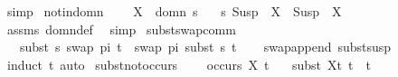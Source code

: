 \begin{isabellebody}
\ simp%
\endisatagproof
{\isafoldproof}%
%
\isadelimproof
\isanewline
%
\endisadelimproof
\isanewline
{}\isamarkupfalse%
\ not{\isacharunderscore}{\kern0pt}in{\isacharunderscore}{\kern0pt}domn{\isacharcolon}{\kern0pt}\ \isanewline
\ \ \ {\isachardoublequoteopen}X\ {\isasymnotin}\ {\isacharparenleft}{\kern0pt}domn\ s{\isacharparenright}{\kern0pt}{\isachardoublequoteclose}\isanewline
\ \ \ {\isachardoublequoteopen}s\ {\isacharparenleft}{\kern0pt}Susp\ {\isacharbrackleft}{\kern0pt}{\isacharbrackright}{\kern0pt}\ X{\isacharparenright}{\kern0pt}\ {\isacharequal}{\kern0pt}\ {\isacharparenleft}{\kern0pt}Susp\ {\isacharbrackleft}{\kern0pt}{\isacharbrackright}{\kern0pt}\ X{\isacharparenright}{\kern0pt}{\isachardoublequoteclose}\isanewline
%
\isadelimproof
\ \ %
\endisadelimproof
%
\isatagproof
{}\isamarkupfalse%
\ assms\ domn{\isacharunderscore}{\kern0pt}def\ \isamarkupfalse%
\ simp%
\endisatagproof
{\isafoldproof}%
%
\isadelimproof
\isanewline
%
\endisadelimproof
\isanewline
{}\isamarkupfalse%
\ subst{\isacharunderscore}{\kern0pt}swap{\isacharunderscore}{\kern0pt}comm{\isacharcolon}{\kern0pt}\ \isanewline
\ \ \ {\isachardoublequoteopen}subst\ s\ {\isacharparenleft}{\kern0pt}swap\ pi\ t{\isacharparenright}{\kern0pt}\ {\isacharequal}{\kern0pt}\ swap\ pi\ {\isacharparenleft}{\kern0pt}subst\ s\ t{\isacharparenright}{\kern0pt}{\isachardoublequoteclose}\isanewline
%
\isadelimproof
\ \ %
\endisadelimproof
%
\isatagproof
{}\isamarkupfalse%
\ swap{\isacharunderscore}{\kern0pt}append\ subst{\isacharunderscore}{\kern0pt}susp\ \isamarkupfalse%
\ {\isacharparenleft}{\kern0pt}induct\ t{\isacharparenright}{\kern0pt}\ auto%
\endisatagproof
{\isafoldproof}%
%
\isadelimproof
\isanewline
%
\endisadelimproof
\isanewline
{}\isamarkupfalse%
\ subst{\isacharunderscore}{\kern0pt}not{\isacharunderscore}{\kern0pt}occurs{\isacharcolon}{\kern0pt}\ \isanewline
\ \ \ {\isachardoublequoteopen}{\isasymnot}{\isacharparenleft}{\kern0pt}occurs\ X\ t{\isacharparenright}{\kern0pt}{\isachardoublequoteclose}\isanewline
\ \ \ {\isachardoublequoteopen}subst\ {\isacharbrackleft}{\kern0pt}{\isacharparenleft}{\kern0pt}X{\isacharcomma}{\kern0pt}t{}{\isacharparenright}{\kern0pt}{\isacharbrackright}{\kern0pt}\ t\ {\isacharequal}{\kern0pt}\ t{\isachardoublequoteclose}\isanewline
%
\isadelimproof
%
\endisadelimproof
%
\isatagproof
{}\isamarkupfalse%

\end{isabellebody}
